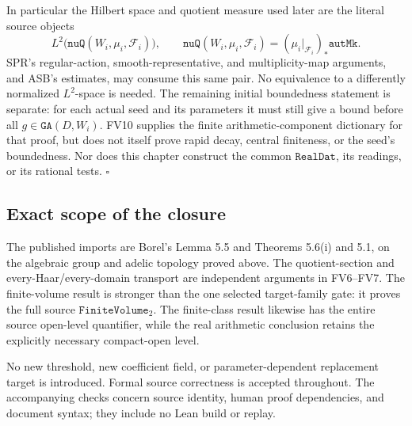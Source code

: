 In particular the Hilbert space and quotient measure used later
are the literal source objects
\[
 L^2\bigl(\texttt{nuQ}(W_i,\mu_i,\mathcal F_i)\bigr),\qquad
 \texttt{nuQ}(W_i,\mu_i,\mathcal F_i)
  =(\mu_i|_{\mathcal F_i})_*\texttt{autMk}.
 \tag{FV.27}
\]
SPR's regular-action, smooth-representative, and multiplicity-map
arguments, and ASB's estimates, may consume this same pair.
No equivalence to a differently normalized \(L^2\)-space is
needed.  The remaining initial boundedness statement is separate:
for each actual seed and its parameters it must still give a
bound before all \(g\in\texttt{GA}(D,W_i)\).  FV10 supplies the
finite arithmetic-component dictionary for that proof, but does
not itself prove rapid decay, central finiteness, or the seed's
boundedness.  Nor does this chapter construct the common
\(\texttt{RealDat}\), its readings, or its rational tests.
\(\square\)

\subsection*{Exact scope of the closure}

The published imports are Borel's Lemma 5.5 and Theorems 5.6(i)
and 5.1, on the algebraic group and adelic topology proved above.
The quotient-section and every-Haar/every-domain transport are
independent arguments in FV6--FV7.  The finite-volume result is
stronger than the one selected target-family gate: it proves the
full source \(\texttt{FiniteVolume}_2\).  The finite-class result
likewise has the entire source open-level quantifier, while the
real arithmetic conclusion retains the explicitly necessary
compact-open level.

No new threshold, new coefficient field, or parameter-dependent
replacement target is introduced.  Formal source correctness
is accepted throughout.  The accompanying checks concern source
identity, human proof dependencies, and document syntax; they
include no Lean build or replay.
